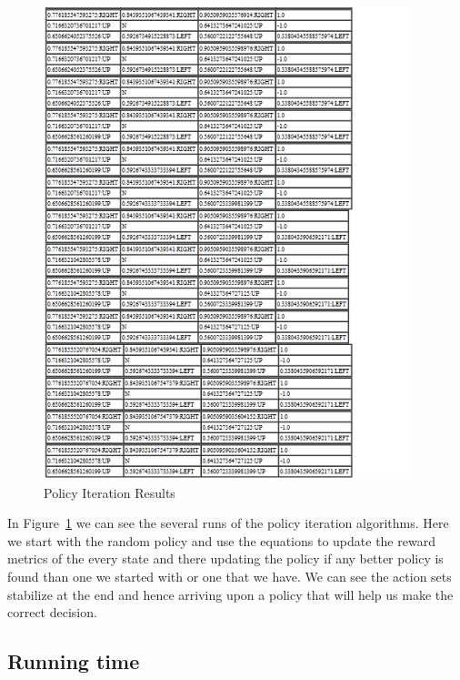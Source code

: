 \begin{figure}[h!]
    \begin{center}
        \includegraphics[width=0.95\textwidth]{Figures/Planning_Figure_4.png}
        \caption{Policy Iteration Results}
        \label{fig:ValueIterationResults3}
    \end{center}
\end{figure}

In Figure~\ref{fig:ValueIterationResults3} we can see the several runs of the policy iteration
algorithms. Here we start with the random policy and use the equations to update
the reward metrics of the every state and there updating the policy if any
better policy is found than one we started with or one that we have. We can see
the action sets stabilize at the end and hence arriving upon a policy that will
help us make the correct decision.

\FloatBarrier

\subsection{Running time}

